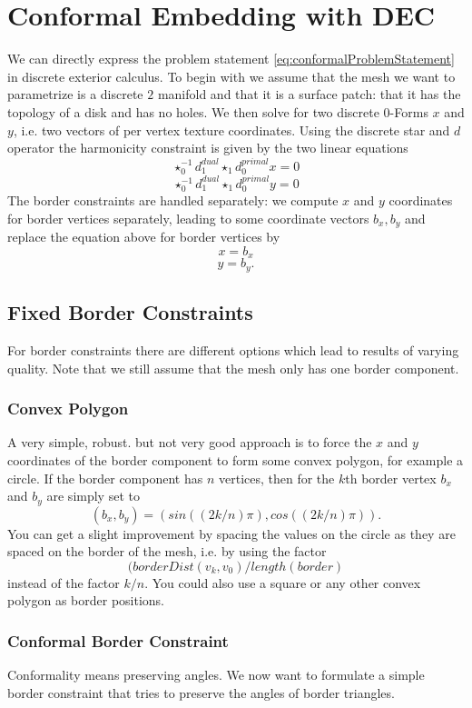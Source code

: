 \section{Conformal Embedding with DEC}
We can directly express the problem statement \ref{eq:conformalProblemStatement} in discrete exterior calculus. To begin with we assume that the mesh we want to parametrize is a discrete $2$ manifold and that it is a surface patch: that it has the topology of a disk and has no holes. We then solve for two discrete $0$-Forms $x$ and $y$, i.e. two vectors of per vertex texture coordinates. Using the discrete star and $d$ operator the harmonicity constraint is given by the two linear equations
\[\star_0^{-1} d_1^{dual} \star_1 d_0^{primal} x = 0\]
\begin{equation}\star_0^{-1} d_1^{dual} \star_1 d_0^{primal} y = 0 \label{eq:conformal}\end{equation}
The border constraints are handled separately: we compute $x$ and $y$ coordinates for border vertices separately, leading to some coordinate vectors $b_x, b_y$ and  replace the equation above for border vertices by
\[ x = b_x\]
\[y = b_y.\]

\subsection{Fixed Border Constraints}
For border constraints there are different options which lead to results of varying quality. Note that we still assume that the mesh only has one border component.

\subsubsection*{Convex Polygon}
A very simple, robust. but not very good approach is to force the $x$ and $y$ coordinates of the border component to form some convex polygon, for example a circle. If the border component has $n$ vertices, then for the $k$th border vertex $b_x$ and $b_y$ are simply set to
\[(b_x,b_y) = (sin((2k/n)\pi),cos((2k/n)\pi)).\] 
You can get a slight improvement by spacing the values on the circle as they are spaced on the border of the mesh, i.e. by using the factor 
\[(borderDist(v_k,v_0)/length(border)\] 
instead of the factor $k/n$. You could also use a square or any other convex polygon as border positions.

\subsubsection*{Conformal Border Constraint}
Conformality means preserving angles. We now want to formulate a simple border constraint that tries to preserve the angles of border triangles. 

